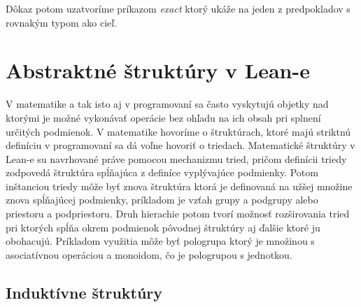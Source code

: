 \documentclass[a4paper,10pt,oneside]{report}%
\begin{document}
Dôkaz potom uzatvoríme príkazom \emph{exact} ktorý ukáže na jeden z predpokladov
    s rovnakým typom ako cieľ.

\section{Abstraktné štruktúry v Lean-e}
    V matematike a tak isto aj v programovaní sa často vyskytujú objetky
nad ktorými je možné vykonávať operácie bez ohľadu na ich obsah pri splnení
určitých podmienok.
    V matematike hovoríme o štruktúrach, ktoré majú striktnú definíciu v programovaní
sa dá voľne hovoriť o triedach.
    Matematické štruktúry v Lean-e su navrhované práve pomocou mechanizmu tried,
pričom definícii triedy zodpovedá štruktúra spĺňajúca z definíce vyplývajúce podmienky.
    Potom inštanciou triedy môže byť znova štruktúra ktorá je definovaná na užšej množine
znova spĺňajúcej podmienky, príkladom je vzťah grupy a podgrupy alebo
priestoru a podpriestoru.
    Druh hierachie potom tvorí možnosť rozširovania tried pri ktorých spĺňa okrem
podmienok pôvodnej štruktúry aj ďalšie ktoré ju obohacujú.
    Príkladom využitia môže byť pologrupa ktorý je množinou s asociatívnou operáciou
a monoidom, čo je pologrupou s jednotkou.
\subsection{Induktívne štruktúry}
\end{document}
